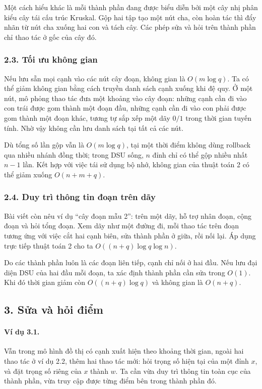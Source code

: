 \documentclass[11pt]{article}
\begin{document}
Một cách hiểu khác là mỗi thành phần đang được biểu diễn bởi một cây nhị phân
kiểu cây tái cấu trúc Kruskal. Gộp hai tập tạo một nút cha, còn hoàn tác thì
đẩy nhãn từ nút cha xuống hai con và tách cây. Các phép sửa và hỏi trên thành
phần chỉ thao tác ở gốc của cây đó.

\subsubsection*{2.3. Tối ưu không gian}

Nếu lưu sẵn mọi cạnh vào các nút cây đoạn, không gian là \(O(m\log q)\). Ta có
thể giảm không gian bằng cách truyền danh sách cạnh xuống khi đệ quy. Ở một
nút, mô phỏng thao tác đưa một khoảng vào cây đoạn: những cạnh cần đi vào con
trái được gom thành một đoạn đầu, những cạnh cần đi vào con phải được gom
thành một đoạn khác, tương tự sắp xếp một dãy \(0/1\) trong thời gian tuyến
tính. Nhờ vậy không cần lưu danh sách tại tất cả các nút.

Dù tổng số lần gộp vẫn là \(O(m\log q)\), tại một thời điểm không dùng rollback
qua nhiều nhánh đồng thời; trong DSU sống, \(n\) đỉnh chỉ có thể gộp nhiều nhất
\(n-1\) lần. Kết hợp với việc tái sử dụng bộ nhớ, không gian của thuật toán 2
có thể giảm xuống \(O(n+m+q)\).

\subsubsection*{2.4. Duy trì thông tin đoạn trên dãy}

Bài viết còn nêu ví dụ ``cây đoạn mẫu 2'': trên một dãy, hỗ trợ nhân đoạn,
cộng đoạn và hỏi tổng đoạn. Xem dãy như một đường đi, mỗi thao tác trên đoạn
tương ứng với việc cắt hai cạnh biên, sửa thành phần ở giữa, rồi nối lại. Áp
dụng trực tiếp thuật toán 2 cho ta \(O((n+q)\log q\log n)\).

Do các thành phần luôn là các đoạn liên tiếp, cạnh chỉ nối ở hai đầu. Nếu lưu
đại diện DSU của hai đầu mỗi đoạn, ta xác định thành phần cần sửa trong
\(O(1)\). Khi đó thời gian giảm còn \(O((n+q)\log q)\) và không gian là
\(O(n+q)\).

\subsection*{3. Sửa và hỏi điểm}

\paragraph{Ví dụ 3.1.}
Vẫn trong mô hình đồ thị có cạnh xuất hiện theo khoảng thời gian, ngoài hai
thao tác ở ví dụ 2.2, thêm hai thao tác mới: hỏi trọng số hiện tại của một đỉnh
\(x\), và đặt trọng số riêng của \(x\) thành \(w\). Ta cần vừa duy trì thông
tin toàn cục của thành phần, vừa truy cập được từng điểm bên trong thành phần
đó.
\end{document}
